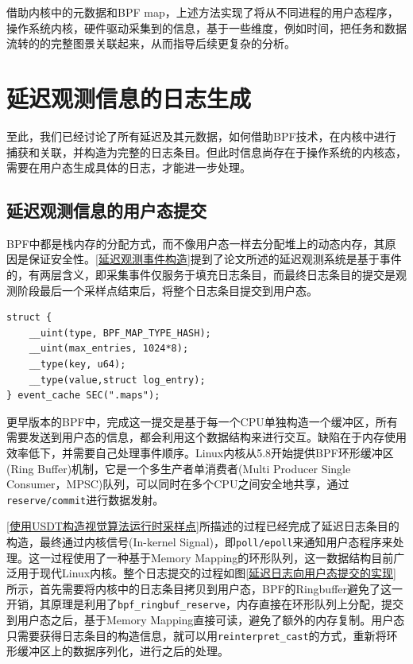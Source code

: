 \documentclass[master,anonymous]{shtthesis}
\begin{document}
借助内核中的元数据和BPF map，上述方法实现了将从不同进程的用户态程序，操作系统内核，硬件驱动采集到的信息，基于一些维度，例如时间，把任务和数据流转的的完整图景关联起来，从而指导后续更复杂的分析。

\section{延迟观测信息的日志生成}\label{延迟观测信息的日志生成}
至此，我们已经讨论了所有延迟及其元数据，如何借助BPF技术，在内核中进行捕获和关联，并构造为完整的日志条目。但此时信息尚存在于操作系统的内核态，需要在用户态生成具体的日志，才能进一步处理。
\subsection{延迟观测信息的用户态提交}
BPF中都是栈内存的分配方式，而不像用户态一样去分配堆上的动态内存，其原因是保证安全性。\ref{延迟观测事件构造}提到了论文所述的延迟观测系统是基于事件的，有两层含义，即采集事件仅服务于填充日志条目，而最终日志条目的提交是观测阶段最后一个采样点结束后，将整个日志条目提交到用户态。
\begin{lstlisting}[caption={日志条目保存map},captionpos=b]
struct {
	__uint(type, BPF_MAP_TYPE_HASH);
	__uint(max_entries, 1024*8);
	__type(key, u64);
	__type(value,struct log_entry);
} event_cache SEC(".maps");
\end{lstlisting}

更早版本的BPF中，完成这一提交是基于每一个CPU单独构造一个缓冲区，所有需要发送到用户态的信息，都会利用这个数据结构来进行交互。缺陷在于内存使用效率低下，并需要自己处理事件顺序。Linux内核从5.8开始提供BPF环形缓冲区(Ring Buffer)\cite{bpfring}机制，它是一个多生产者单消费者(Multi Producer Single Consumer，MPSC)队列，可以同时在多个CPU之间安全地共享，通过\verb*|reserve/commit|进行数据发射。

\ref{使用USDT构造视觉算法运行时采样点}所描述的过程已经完成了延迟日志条目的构造，最终通过内核信号(In-kernel Signal)，即\verb*|poll/epoll|来通知用户态程序来处理。这一过程使用了一种基于Memory Mapping的环形队列，这一数据结构目前广泛用于现代Linux内核。整个日志提交的过程如图\ref{延迟日志向用户态提交的实现}所示，首先需要将内核中的日志条目拷贝到用户态，BPF的Ringbuffer避免了这一开销，其原理是利用了\verb*|bpf_ringbuf_reserve|，内存直接在环形队列上分配，提交到用户态之后，基于Memory Mapping直接可读，避免了额外的内存复制。用户态只需要获得日志条目的构造信息，就可以用\verb*|reinterpret_cast|的方式，重新将环形缓冲区上的数据序列化，进行之后的处理。
\end{document}
